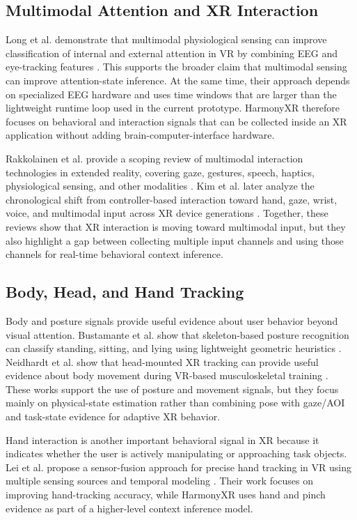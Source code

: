 \documentclass[conference]{IEEEtran}
\begin{document}
\subsection{Multimodal Attention and XR Interaction}
Long et al. demonstrate that multimodal physiological sensing can improve classification of internal and external attention in VR by combining EEG and eye-tracking features \cite{long2024multimodal}. This supports the broader claim that multimodal sensing can improve attention-state inference. At the same time, their approach depends on specialized EEG hardware and uses time windows that are larger than the lightweight runtime loop used in the current prototype. HarmonyXR therefore focuses on behavioral and interaction signals that can be collected inside an XR application without adding brain-computer-interface hardware.

Rakkolainen et al. provide a scoping review of multimodal interaction technologies in extended reality, covering gaze, gestures, speech, haptics, physiological sensing, and other modalities \cite{rakkolainen2021technologies}. Kim et al. later analyze the chronological shift from controller-based interaction toward hand, gaze, wrist, voice, and multimodal input across XR device generations \cite{kim2026controllers}. Together, these reviews show that XR interaction is moving toward multimodal input, but they also highlight a gap between collecting multiple input channels and using those channels for real-time behavioral context inference.

\subsection{Body, Head, and Hand Tracking}
Body and posture signals provide useful evidence about user behavior beyond visual attention. Bustamante et al. show that skeleton-based posture recognition can classify standing, sitting, and lying using lightweight geometric heuristics \cite{bustamante2025skeleton}. Neidhardt et al. show that head-mounted XR tracking can provide useful evidence about body movement during VR-based musculoskeletal training \cite{neidhardt2023body}. These works support the use of posture and movement signals, but they focus mainly on physical-state estimation rather than combining pose with gaze/AOI and task-state evidence for adaptive XR behavior.

Hand interaction is another important behavioral signal in XR because it indicates whether the user is actively manipulating or approaching task objects. Lei et al. propose a sensor-fusion approach for precise hand tracking in VR using multiple sensing sources and temporal modeling \cite{lei2023hand}. Their work focuses on improving hand-tracking accuracy, while HarmonyXR uses hand and pinch evidence as part of a higher-level context inference model.
\end{document}
